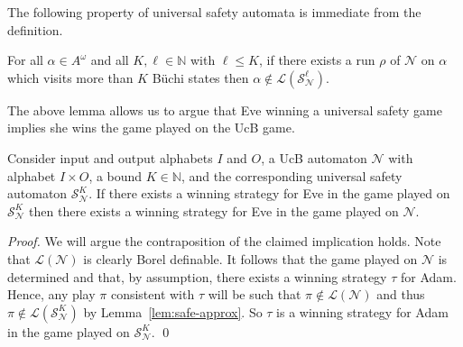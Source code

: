 \documentclass[runningheads,a4paper,draft]{llncs}
\newcommand{\eve}{Eve\xspace}
\newcommand{\adam}{Adam\xspace}
\newcommand{\calN}{\mathcal{N}}
\newcommand{\calS}{\mathcal{S}}
\newcommand{\lang}[1]{\mathcal{L}({#1})}
\begin{document}
The following property of universal safety automata is immediate from the
definition.
\begin{lemma}\label{lem:safe-approx}
  For all $\alpha \in A^\omega$ and all $K,\ell \in \mathbb{N}$ with $\ell
  \leq K$, if there exists a run $\rho$ of $\calN$ on $\alpha$ which visits
  more than $K$ B\"uchi states then $\alpha \not\in \lang{\calS^\ell_\calN}$.
\end{lemma}

The above lemma allows us to argue that \eve winning a universal safety game
implies she wins the game played on the UcB game.
\begin{lemma}
    Consider input and output alphabets $I$ and $O$, a UcB
    automaton $\calN$ with alphabet $I \times O$, a bound $K \in \mathbb{N}$,
    and the corresponding universal safety automaton $\calS^K_\calN$. If there
    exists a winning strategy for \eve in the game played on $\calS^K_\calN$
    then there exists a winning strategy for \eve in the game played on
    $\calN$.
\end{lemma}
\begin{proof}
    We will argue the contraposition of the claimed implication holds.
    Note that $\lang{\calN}$ is clearly Borel definable. It follows that the
    game played on $\calN$ is determined and that, by assumption, there exists a
    winning strategy $\tau$ for \adam. Hence, any play $\pi$ consistent with
    $\tau$ will be such that $\pi \not\in \lang{\calN}$ and thus $\pi \not\in
    \lang{\calS^K_\calN}$ by Lemma~\ref{lem:safe-approx}.
    So $\tau$ is a winning strategy for \adam in the game
    played on $\calS^K_\calN$.
\qed\end{proof}
\end{document}
